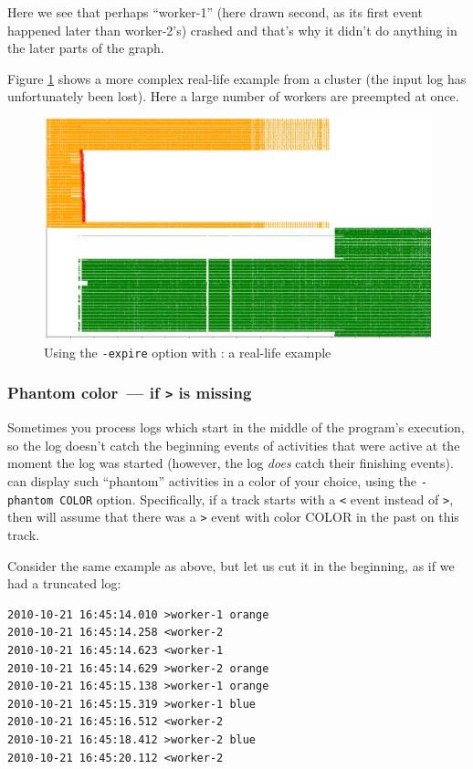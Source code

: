 \documentclass{article}
\begin{document}
Here we see that perhaps ``worker-1'' (here drawn second, as its first event happened later than worker-2's) crashed and that's why it didn't do anything in the later parts of the graph.

Figure \ref{fig:splot-expire-large-example} shows a more complex real-life example from a cluster (the input log has unfortunately been lost). Here a large number of workers are preempted at once.

\begin{figure}
\center
\includegraphics[width=\textwidth]{pics/splot/splot-expire-large-example.png}
\caption{Using the \texttt{-expire} option with \splot{}: a real-life example}
\label{fig:splot-expire-large-example}
\end{figure}

\subsubsection{Phantom color~--- if \texttt{>} is missing}

Sometimes you process logs which start in the middle of the program's execution, so the log doesn't catch the beginning events of activities that were active at the moment the log was started (however, the log \emph{does} catch their finishing events). \splot{} can display such ``phantom'' activities in a color of your choice, using the \verb|-phantom COLOR| option. Specifically, if a track starts with a \texttt{<} event instead of \texttt{>}, then \splot{} will assume that there was a \texttt{>} event with color COLOR in the past on this track.

Consider the same example as above, but let us cut it in the beginning, as if we had a truncated log:

\begin{verbatim}
2010-10-21 16:45:14.010 >worker-1 orange
2010-10-21 16:45:14.258 <worker-2
2010-10-21 16:45:14.623 <worker-1
2010-10-21 16:45:14.629 >worker-2 orange
2010-10-21 16:45:15.138 >worker-1 orange
2010-10-21 16:45:15.319 >worker-1 blue
2010-10-21 16:45:16.512 <worker-2
2010-10-21 16:45:18.412 >worker-2 blue
2010-10-21 16:45:20.112 <worker-2
\end{verbatim}
\end{document}

